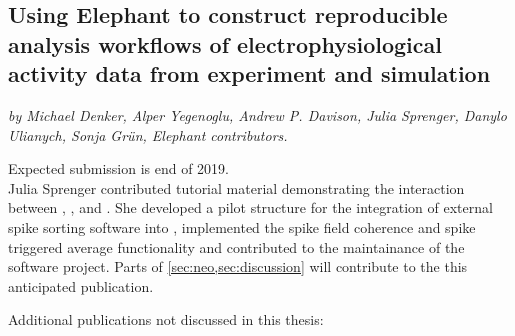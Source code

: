 \subsection*{Using Elephant to construct reproducible analysis workflows of electrophysiological activity data from experiment and simulation}
\textit{by Michael Denker, Alper Yegenoglu, Andrew P. Davison, Julia Sprenger, Danylo Ulianych, Sonja Grün, Elephant contributors.}

Expected submission is end of 2019.\\

Julia Sprenger contributed tutorial material demonstrating the interaction between , ,  and . She developed a pilot structure for the integration of external spike sorting software into , implemented the spike field coherence and spike triggered average functionality and contributed to the maintainance of the software project. Parts of \cref{sec:neo,sec:discussion} will contribute to the this anticipated publication.


\clearpage
Additional publications not discussed in this thesis:




\hypersetup{pageanchor=true} %
